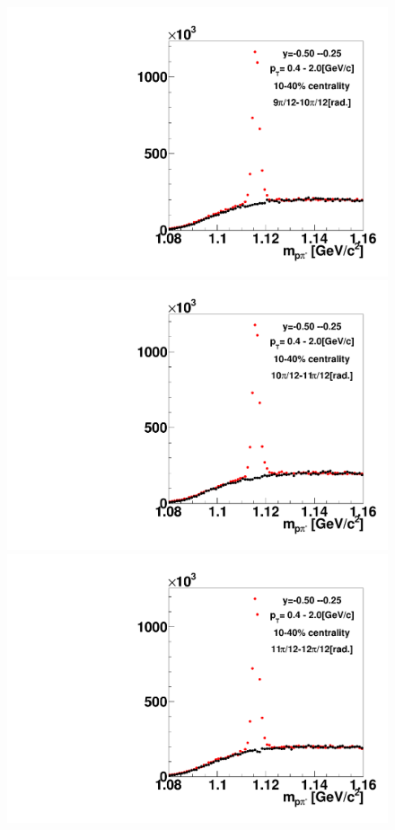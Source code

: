 \begin{figure}[h]
\includegraphics[width=0.14\linewidth]{chapterX/fig/ld_v2_sig/kf_ptslice0_cent1_ld_flow_phi10_rap3_check.pdf}
\includegraphics[width=0.14\linewidth]{chapterX/fig/ld_v2_sig/kf_ptslice0_cent1_ld_flow_phi11_rap3_check.pdf}
\includegraphics[width=0.14\linewidth]{chapterX/fig/ld_v2_sig/kf_ptslice0_cent1_ld_flow_phi12_rap3_check.pdf}


\end{figure}
